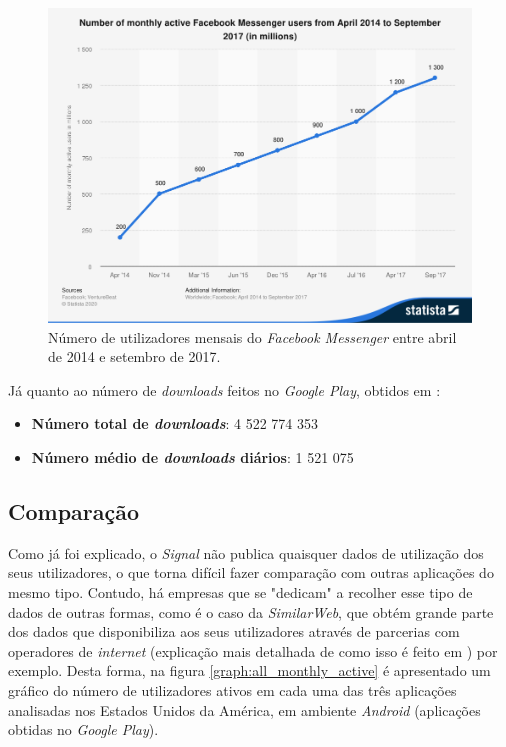 \begin{figure}[H]
   \begin{center}
       \includegraphics[width=15cm]{img/statistic_id417295_facebook-messenger_-number-of-monthly-active-users-2014-2017.png}
       \caption{Número de utilizadores mensais do \textit{Facebook Messenger} entre abril de 2014 e setembro de 2017. \cite{messenger_monthly_users}}
       \label{graph:messenger_monthly_active}
   \end{center}
\end{figure}

Já quanto ao número de \textit{downloads} feitos no \textit{Google Play}, obtidos em \cite{messenger_downloads_android}:

\begin{itemize}
   \item \textbf{Número total de \textit{downloads}}: 4 522 774 353
   \item \textbf{Número médio de \textit{downloads} diários}: 1 521 075
\end{itemize}


\subsection{Comparação}
Como já foi explicado, o \textit{Signal} não publica quaisquer dados de utilização dos seus utilizadores, o que torna difícil fazer comparação com outras aplicações do mesmo tipo. Contudo, há empresas que se "dedicam" a recolher esse tipo de dados de outras formas, como é o caso da \textit{SimilarWeb}, que obtém grande parte dos dados que disponibiliza aos seus utilizadores através de parcerias com operadores de \textit{internet} (explicação mais detalhada de como isso é feito em \cite{first_report}) por exemplo. \cite{similar_web_methodology}
Desta forma, na figura \ref{graph:all_monthly_active} é apresentado um gráfico do número de utilizadores ativos em cada uma das três aplicações analisadas nos Estados Unidos da América, em ambiente \textit{Android} (aplicações obtidas no \textit{Google Play}).


